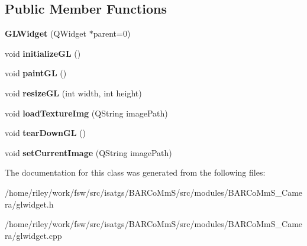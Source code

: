 \subsection*{Public Member Functions}
\begin{DoxyCompactItemize}
\item 
{\bfseries G\+L\+Widget} (Q\+Widget $\ast$parent=0)\hypertarget{class_g_l_widget_ab79c391c86de1ffb76f6950b49d82c0c}{}\label{class_g_l_widget_ab79c391c86de1ffb76f6950b49d82c0c}

\item 
void {\bfseries initialize\+GL} ()\hypertarget{class_g_l_widget_a7fab13e8cc9fc0730ca54c08b2c923a7}{}\label{class_g_l_widget_a7fab13e8cc9fc0730ca54c08b2c923a7}

\item 
void {\bfseries paint\+GL} ()\hypertarget{class_g_l_widget_a640b5570cb2b37724fd5b58a77339c5e}{}\label{class_g_l_widget_a640b5570cb2b37724fd5b58a77339c5e}

\item 
void {\bfseries resize\+GL} (int width, int height)\hypertarget{class_g_l_widget_ac0d2a8ecf60907a81c0d73475d851025}{}\label{class_g_l_widget_ac0d2a8ecf60907a81c0d73475d851025}

\item 
void {\bfseries load\+Texture\+Img} (Q\+String image\+Path)\hypertarget{class_g_l_widget_a1d6481cdcdaac818086d802ccfe47425}{}\label{class_g_l_widget_a1d6481cdcdaac818086d802ccfe47425}

\item 
void {\bfseries tear\+Down\+GL} ()\hypertarget{class_g_l_widget_a39c0ae6fe9b0249dd495533d2164e9b6}{}\label{class_g_l_widget_a39c0ae6fe9b0249dd495533d2164e9b6}

\item 
void {\bfseries set\+Current\+Image} (Q\+String image\+Path)\hypertarget{class_g_l_widget_ac5e85a5dd05e92833bc542545436c15b}{}\label{class_g_l_widget_ac5e85a5dd05e92833bc542545436c15b}

\end{DoxyCompactItemize}


The documentation for this class was generated from the following files\+:\begin{DoxyCompactItemize}
\item 
/home/riley/work/fsw/src/isatgs/\+B\+A\+R\+Co\+Mm\+S/src/modules/\+B\+A\+R\+Co\+Mm\+S\+\_\+\+Camera/glwidget.\+h\item 
/home/riley/work/fsw/src/isatgs/\+B\+A\+R\+Co\+Mm\+S/src/modules/\+B\+A\+R\+Co\+Mm\+S\+\_\+\+Camera/glwidget.\+cpp\end{DoxyCompactItemize}
